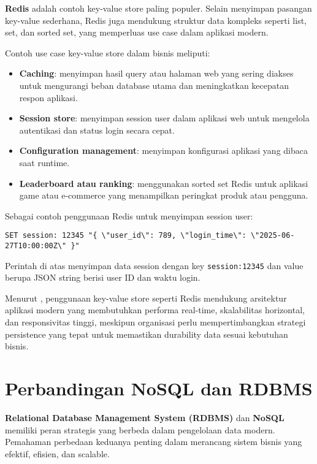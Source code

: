 \textbf{Redis} adalah contoh key-value store paling populer. Selain menyimpan pasangan key-value sederhana, Redis juga mendukung struktur data kompleks seperti list, set, dan sorted set, yang memperluas use case dalam aplikasi modern.

Contoh use case key-value store dalam bisnis meliputi:
\begin{itemize}
	\item \textbf{Caching}: menyimpan hasil query atau halaman web yang sering diakses untuk mengurangi beban database utama dan meningkatkan kecepatan respon aplikasi.
	\item \textbf{Session store}: menyimpan session user dalam aplikasi web untuk mengelola autentikasi dan status login secara cepat.
	\item \textbf{Configuration management}: menyimpan konfigurasi aplikasi yang dibaca saat runtime.
	\item \textbf{Leaderboard atau ranking}: menggunakan sorted set Redis untuk aplikasi game atau e-commerce yang menampilkan peringkat produk atau pengguna.
\end{itemize}

Sebagai contoh penggunaan Redis untuk menyimpan session user:

\begin{lstlisting}[style=JavaScript, caption={Contoh perintah Redis untuk menyimpan session user}, label={lst:redis_session}]
	SET session: 12345 "{ \"user_id\": 789, \"login_time\": \"2025-06-27T10:00:00Z\" }"
\end{lstlisting}

Perintah di atas menyimpan data session dengan key \texttt{session:12345} dan value berupa JSON string berisi user ID dan waktu login.

Menurut \cite{gandomi2015}, penggunaan key-value store seperti Redis mendukung arsitektur aplikasi modern yang membutuhkan performa real-time, skalabilitas horizontal, dan responsivitas tinggi, meskipun organisasi perlu mempertimbangkan strategi persistence yang tepat untuk memastikan durability data sesuai kebutuhan bisnis.



\section{Perbandingan NoSQL dan RDBMS}

\textbf{Relational Database Management System (RDBMS)} dan \textbf{NoSQL} memiliki peran strategis yang berbeda dalam pengelolaan data modern. Pemahaman perbedaan keduanya penting dalam merancang sistem bisnis yang efektif, efisien, dan scalable.

